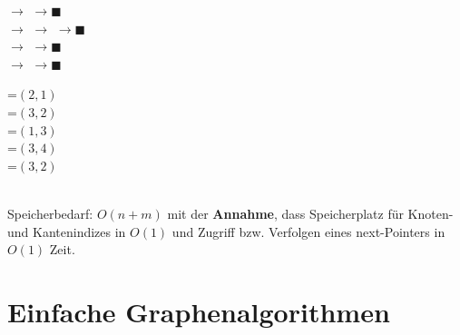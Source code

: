 \documentclass[12pt,a4paper]{article}
\theoremstyle{plain}
\numberwithin{equation}{section}
\begin{document}
\hspace*{1cm}
\begin{minipage}{0.25\textwidth}
\vspace*{0.1cm}
 $\rightarrow$  $\rightarrow \blacksquare$\\
 $\rightarrow$  $\rightarrow$  $\rightarrow \blacksquare$ \\
 $\rightarrow$  $\rightarrow \blacksquare$ \\
 $\rightarrow$  $\rightarrow \blacksquare$
\vspace*{0.1cm}
\end{minipage}
\hspace*{1cm}
\begin{minipage}{0.2\textwidth}
\vspace*{0.1cm}
=$(2,1)$\\
=$(3,2)$\\
=$(1,3)$\\
=$(3,4)$\\
=$(3,2)$
\vspace*{0.1cm}
\end{minipage}\\
Speicherbedarf: $O(n+m)$ mit der \textbf{Annahme}, dass Speicherplatz für Knoten- und Kantenindizes in $O(1)$ und Zugriff bzw. Verfolgen eines next-Pointers in $O(1)$ Zeit.
\section{Einfache Graphenalgorithmen}
\end{document}
